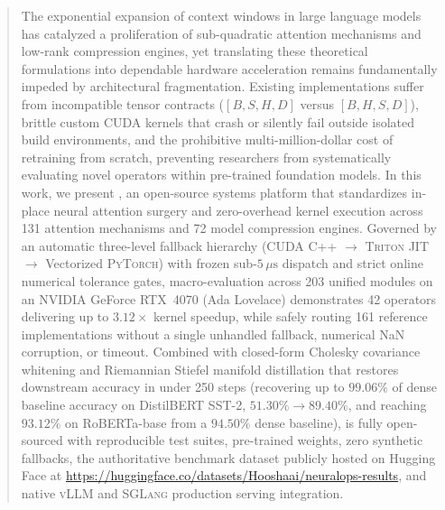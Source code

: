 
\begin{abstract}
The exponential expansion of context windows in large language models has catalyzed a proliferation of sub-quadratic attention mechanisms and low-rank compression engines, yet translating these theoretical formulations into dependable hardware acceleration remains fundamentally impeded by architectural fragmentation.
Existing implementations suffer from incompatible tensor contracts ($[B, S, H, D]$ versus $[B, H, S, D]$), brittle custom CUDA kernels that crash or silently fail outside isolated build environments, and the prohibitive multi-million-dollar cost of retraining from scratch, preventing researchers from systematically evaluating novel operators within pre-trained foundation models.
In this work, we present \neuralops{}, an open-source systems platform that standardizes in-place neural attention surgery and zero-overhead kernel execution across 131 attention mechanisms and 72 model compression engines.
Governed by an automatic three-level fallback hierarchy (\textsc{CUDA C++} $\to$ \textsc{Triton JIT} $\to$ Vectorized \textsc{PyTorch}) with frozen sub-$5\,\mu\text{s}$ dispatch and strict online numerical tolerance gates, macro-evaluation across 203 unified modules on an NVIDIA GeForce RTX~4070 (Ada Lovelace) demonstrates 42 \passfast{} operators delivering up to $3.12\times$ kernel speedup, while safely routing 161 reference implementations without a single unhandled fallback, numerical NaN corruption, or timeout.
Combined with closed-form Cholesky covariance whitening and Riemannian Stiefel manifold distillation that restores downstream accuracy in under 250 steps (recovering up to $99.06\%$ of dense baseline accuracy on DistilBERT SST-2, $51.30\% \to 89.40\%$, and reaching $93.12\%$ on RoBERTa-base from a $94.50\%$ dense baseline), \neuralops{} is fully open-sourced with reproducible test suites, pre-trained weights, zero synthetic fallbacks, the authoritative benchmark dataset publicly hosted on Hugging Face at \url{https://huggingface.co/datasets/Hooshaai/neuralops-results}, and native \textsc{vLLM} and \textsc{SGLang} production serving integration.
\end{abstract}
